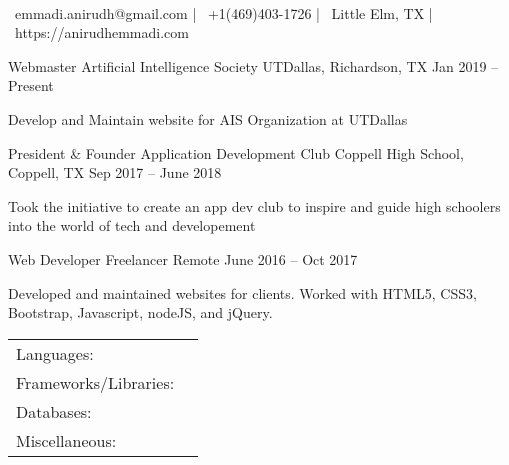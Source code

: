 \documentclass[]{awesome-cv}
\begin{document}
    
\begin{center}
	  \\
	\vspace{2mm}
	{\faEnvelope\ emmadi.anirudh@gmail.com} | {\faMobile\ +1(469)403-1726} | {\faMapMarker\ Little Elm, TX} | {\faLink\ https://anirudhemmadi.com}
\end{center}
\begin{cventries}
	\cventry
	{Webmaster}
	{Artificial Intelligence Society}
	{UTDallas, Richardson, TX}
	{Jan 2019 – Present}
	{\begin{cvitems}
		\item {Develop and Maintain website for AIS Organization at UTDallas}
		\end{cvitems}}
	\cventry
	{President \& Founder}
	{Application Development Club}
	{Coppell High School, Coppell, TX}
	{Sep 2017 – June 2018}
	{\begin{cvitems}
		\item {Took the initiative to create an app dev club to inspire and guide high schoolers into the world of tech and developement}
		\end{cvitems}}
	\cventry
	{Web Developer}
	{Freelancer}
	{Remote}
	{June 2016 – Oct 2017}
	{\begin{cvitems}
		\item {Developed and maintained websites for clients. Worked with HTML5, CSS3, Bootstrap, Javascript, nodeJS, and jQuery.}
		\end{cvitems}}
\end{cventries}
\begin{cventries}
	\cventry
	{}
	{\def\arraystretch{1.15}{\begin{tabular}{ l l }
		Languages:  & {\skill{ Java, C++, JavaScript (ES6), HTML, CSS}} \\
		Frameworks/Libraries:  & {\skill{ NodeJS, ReactJS, React-Native, jQuery, Bootstrap}} \\
		Databases:  & {\skill{ MongoDB, NoSQL, Firebase}} \\
		Miscellaneous:  & {\skill{ Git + Github, Linux Command Line, Markdown, JSON, API Calling}} \\
		\end{tabular}}}
	{}
	{}
	{}
\end{cventries}
\end{document}
